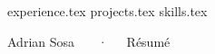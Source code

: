 \documentclass{awesome-cv}
\newcommand*{\sectiondir}{manager/}
\begin{document}
\makecvheader


{experience.tex}
{projects.tex}
{skills.tex}

\makecvfooter
  {}
  {Adrian Sosa ~~~·~~~Résumé}
  {}
\end{document}
